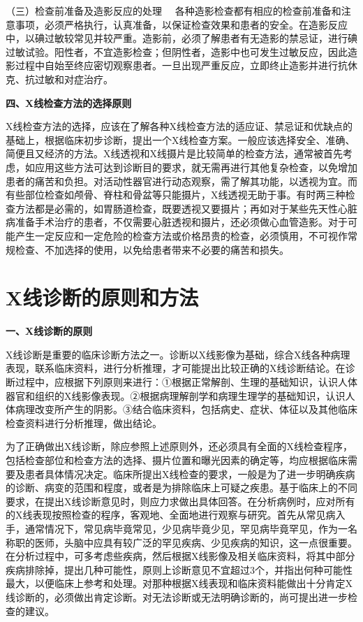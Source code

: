 （三）{检查前准备及造影反应的处理}
　各种造影检查都有相应的检查前准备和注意事项，必须严格执行，认真准备，以保证检查效果和患者的安全。在造影反应中，以碘过敏较常见并较严重。造影前，必须了解患者有无造影的禁忌证，进行碘过敏试验。阳性者，不宜造影检查；但阴性者，造影中也可发生过敏反应，因此造影过程中自始至终应密切观察患者。一旦出现严重反应，立即终止造影并进行抗休克、抗过敏和对症治疗。

\textbf{四、X线检查方法的选择原则}

X线检查方法的选择，应该在了解各种X线检查方法的适应证、禁忌证和优缺点的基础上，根据临床初步诊断，提出一个X线检查方案。一般应该选择安全、准确、简便且又经济的方法。X线透视和X线摄片是比较简单的检查方法，通常被首先考虑，如应用这些方法可达到诊断目的要求，就无需再进行其他复杂检查，以免增加患者的痛苦和负担。对活动性器官进行动态观察，需了解其功能，以透视为宜。而有些部位检查如颅骨、脊柱和骨盆等只能摄片，X线透视无助于事。有时两三种检查方法都是必需的，如胃肠道检查，既要透视又要摄片；再如对于某些先天性心脏病准备手术治疗的患者，不仅需要心脏透视和摄片，还必须做心血管造影。对于可能产生一定反应和一定危险的检查方法或价格昂贵的检查，必须慎用，不可视作常规检查、不加选择的使用，以免给患者带来不必要的痛苦和损失。

\section{X线诊断的原则和方法}

\textbf{一、X线诊断的原则}

X线诊断是重要的临床诊断方法之一。诊断以X线影像为基础，综合X线各种病理表现，联系临床资料，进行分析推理，才可能提出比较正确的X线诊断结论。在诊断过程中，应根据下列原则来进行：①根据正常解剖、生理的基础知识，认识人体器官和组织的X线影像表现。②根据病理解剖学和病理生理学的基础知识，认识人体病理改变所产生的阴影。③结合临床资料，包括病史、症状、体征以及其他临床检查资料进行分析推理，做出结论。

为了正确做出X线诊断，除应参照上述原则外，还必须具有全面的X线检查程序，包括检查部位和检查方法的选择、摄片位置和曝光因素的确定等，均应根据临床需要及患者具体情况决定。临床所提出X线检查的要求，一般是为了进一步明确疾病的诊断、病变的范围和程度，或者是为排除临床上可疑之疾患。基于临床上的不同要求，在提出X线诊断意见时，则应力求做出具体回答。在分析病例时，应对所有的X线表现按照检查的程序，客观地、全面地进行观察与研究。首先从常见病入手，通常情况下，常见病毕竟常见，少见病毕竟少见，罕见病毕竟罕见，作为一名称职的医师，头脑中应具有较广泛的罕见疾病、少见疾病的知识，这一点很重要。在分析过程中，可多考虑些疾病，然后根据X线影像及相关临床资料，将其中部分疾病排除掉，提出几种可能性，原则上诊断意见不宜超过3个，并指出何种可能性最大，以便临床上参考和处理。对那种根据X线表现和临床资料能做出十分肯定X线诊断的，必须做出肯定诊断。对无法诊断或无法明确诊断的，尚可提出进一步检查的建议。

